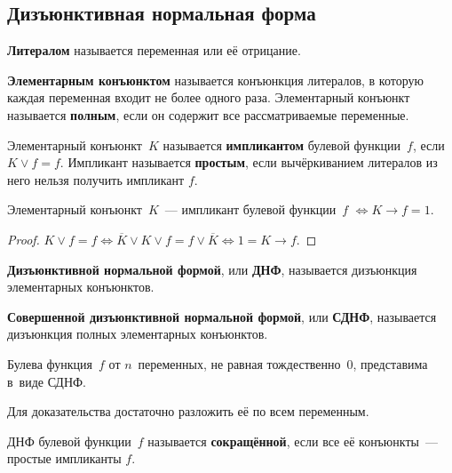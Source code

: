 \subsection{Дизъюнктивная нормальная форма}
 \textbf{Литералом} называется переменная или её отрицание.

 \textbf{Элементарным конъюнктом} называется конъюнкция литералов, в которую каждая переменная входит не более одного раза.
Элементарный конъюнкт называется \textbf{полным}, если он содержит все рассматриваемые переменные.

 Элементарный конъюнкт~$K$ называется \textbf{импликантом} булевой функции~$f$, если $K \lor f = f$.
Импликант называется \textbf{простым}, если вычёркиванием литералов из него нельзя получить импликант $f$.

\begin{statement}
Элементарный конъюнкт~$K$~--- импликант булевой функции~$f$ $\Leftrightarrow K \rightarrow f = 1$.
\end{statement}
\begin{proof}
$K \lor f = f \Leftrightarrow
\overline K \lor K \lor f = f \lor \overline K \Leftrightarrow
1 = K \rightarrow f$.
\end{proof}

\textbf{Дизъюнктивной нормальной формой}, или \textbf{ДНФ}, называется дизъюнкция элементарных конъюнктов.

\textbf{Совершенной дизъюнктивной нормальной формой}, или \textbf{СДНФ}, называется дизъюнкция полных элементарных конъюнктов.

\begin{statement}
Булева функция~$f$ от $n$~переменных, не равная тождественно~$0$, представима в~виде СДНФ.
\end{statement}%
Для доказательства достаточно разложить её по всем переменным.

ДНФ булевой функции~$f$ называется \textbf{сокращённой}, если все её конъюнкты~--- простые импликанты $f$.

